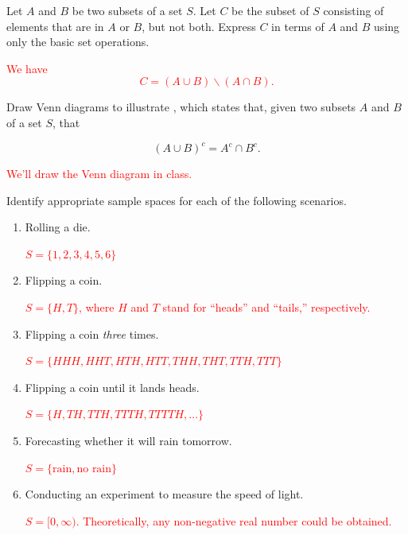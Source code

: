 \documentclass[12pt,reqno]{amsart}
\begin{document}
\bigskip

\prob Let $A$ and $B$ be two subsets of a set $S$. Let $C$ be the subset of $S$ consisting of elements that are in $A$ or $B$, but not both. Express $C$ in terms of $A$ and $B$ using only the basic set operations.

\bigskip
\textcolor{red}{We have
	\[
	C = (A\cup B) \smallsetminus (A\cap B).
	\]}
\bigskip
















\prob Draw Venn diagrams to illustrate , which states that, given two subsets $A$ and $B$ of a set $S$, that

	\[
	(A\cup B)^c = A^c \cap B^c.
	\]

\bigskip
\textcolor{red}{We'll draw the Venn diagram in class.}
\bigskip











\prob Identify appropriate sample spaces for each of the following scenarios.

\medskip
\begin{enumerate}
\item Rolling a die.
    
\medskip
\textcolor{red}{$S = \{1,2,3,4,5,6\}$}
\bigskip

\item Flipping a coin.
    
\medskip
\textcolor{red}{$S = \{H,T\}$, where $H$ and $T$ stand for ``heads'' and ``tails,'' respectively.}
\bigskip

\item Flipping a coin \textit{three} times.
    
\medskip
\textcolor{red}{$S = \{HHH, HHT, HTH, HTT, THH, THT, TTH, TTT \}$}
\bigskip

\item Flipping a coin until it lands heads.
    
\medskip
\textcolor{red}{$S = \{H, TH, TTH, TTTH, TTTTH, \ldots\}$}
\bigskip

\item Forecasting whether it will rain tomorrow.
    
\medskip
\textcolor{red}{$S = \{\text{rain}, \text{no rain}\}$}
\bigskip

\item Conducting an experiment to measure the speed of light.
    
\medskip
\textcolor{red}{$S = [0,\infty)$. Theoretically, any non-negative real number could be obtained.}
\end{enumerate}
\end{document}
